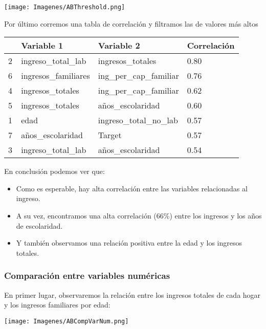 \documentclass[a4paper]{article}
\begin{document}
        \begin{center}
            \texttt{[image: Imagenes/ABThreshold.png]}
        \end{center}
 
        Por último corremos una tabla de correlación y filtramos las de valores más altos
 
        \begin{table}[H]
            \centering
            \begin{tabular}{|l|l|l|l|}
            \hline
                ~ & Variable 1 & Variable 2 & Correlación \\ \hline
                2 & ingreso\_total\_lab & ingresos\_totales & 0.80 \\ \hline
                6 & ingresos\_familiares & ing\_per\_cap\_familiar & 0.76 \\ \hline
                4 & ingresos\_totales & ing\_per\_cap\_familiar & 0.62 \\ \hline
                5 & ingresos\_totales & años\_escolaridad & 0.60 \\ \hline
                1 & edad & ingreso\_total\_no\_lab & 0.57 \\ \hline
                7 & años\_escolaridad & Target & 0.57 \\ \hline
                3 & ingreso\_total\_lab & años\_escolaridad & 0.54 \\ \hline
            \end{tabular}
        \end{table}
 
        En conclusión podemos ver que:
        \begin{itemize}
            \item Como es esperable, hay alta correlación entre las variables relacionadas al ingreso.
            \item A su vez, encontramos una alta correlación (66\%) entre los ingresos y los años de escolaridad.
            \item Y también observamos una relación positiva entre la edad y los ingresos totales.
        \end{itemize}
 
        \subsubsection{Comparación entre variables numéricas}
 
            En primer lugar, observaremos la relación entre los ingresos totales de cada hogar y los ingresos familiares por edad:
            \begin{center}
                \texttt{[image: Imagenes/ABCompVarNum.png]}
            \end{center}
 
\end{document}
